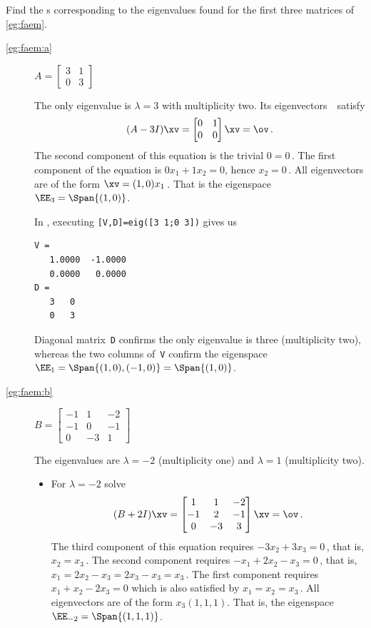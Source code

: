 \begin{example} \label{eg:faespm}
Find the s corresponding to the eigenvalues found for the first three matrices of \autoref{eg:faem}.
\begin{description}
\item[\ref{eg:faem:a}]
\(A=\begin{bmatrix} 3&1\\0&3 \end{bmatrix}\)
\begin{solution} 
The only eigenvalue is \(\lambda=3\) with multiplicity two.
Its eigenvectors~\xv\ satisfy
\begin{equation*}
(A-3 I)\xv=\begin{bmatrix} 0&1\\0&0 \end{bmatrix}\xv=\ov\,.
\end{equation*}
The second component of this equation is the trivial \(0=0\)\,.  The first component of the equation is \(0x_1+1x_2=0\), hence \(x_2=0\)\,.
All eigenvectors are of the form \(\xv=(1,0)x_1\)\,.  
That is the eigenspace  \(\EE_3=\Span\{(1,0)\}\).

In \script, executing \verb|[V,D]=eig([3 1;0 3])| gives us
\begin{verbatim}
V =
   1.0000  -1.0000
   0.0000   0.0000
D =
   3   0
   0   3
\end{verbatim}
Diagonal matrix~\verb|D| confirms the only eigenvalue is three (multiplicity two), whereas the two columns of~\verb|V| confirm the eigenspace \(\EE_1=\Span\{(1,0),(-1,0)\}=\Span\{(1,0)\}\).
\end{solution}


\item[\ref{eg:faem:b}]
\(B=\begin{bmatrix}-1&1&-2
\\-1&0&-1
\\0&-3&1 \end{bmatrix}\)
\begin{solution} 
The eigenvalues are \(\lambda=-2\) (multiplicity one) and \(\lambda=1\) (multiplicity two).
\begin{itemize}
\item For \(\lambda=-2\) solve
\begin{equation*}
(B+2I)\xv=\begin{bmatrix}1&1&-2
\\-1&2&-1
\\0&-3&3 \end{bmatrix}\xv=\ov\,.
\end{equation*}
The third component of this equation requires \(-3x_2+3x_3=0\)\,, that is, \(x_2=x_3\)\,.
The second component requires \(-x_1+2x_2-x_3=0\)\,, that is, \(x_1=2x_2-x_3=2x_3-x_3=x_3\)\,.
The first component requires \(x_1+x_2-2x_3=0\) which is also satisfied by \(x_1=x_2=x_3\)\,.
All eigenvectors are of the form \(x_3(1,1,1)\).
That is, the eigenspace \(\EE_{-2}=\Span\{(1,1,1)\}\).


\end{itemize}
\end{solution}
\end{description}
\end{example}
